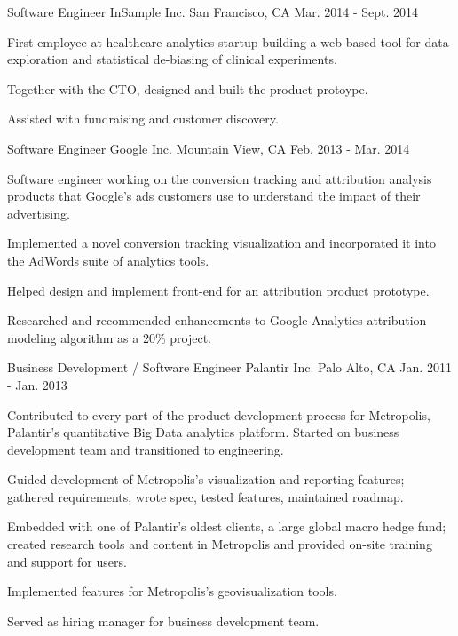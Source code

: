 \begin{cventries}
  \cventry
    {Software Engineer} %
    {InSample Inc.} %
    {San Francisco, CA} %
    {Mar. 2014 - Sept. 2014} %
    {
      \begin{cvitems} %
        \item {First employee at healthcare analytics startup building a web-based tool for data exploration and statistical de-biasing of clinical experiments.}
        \item {Together with the CTO, designed and built the product protoype.}
        \item {Assisted with fundraising and customer discovery.}
      \end{cvitems}
    }

  \cventry
    {Software Engineer} %
    {Google Inc.} %
    {Mountain View, CA} %
    {Feb. 2013 - Mar. 2014} %
    {
      \begin{cvitems} %
        \item {Software engineer working on the conversion tracking and attribution analysis products that Google’s ads customers use to understand the impact of their advertising.}
        \item {Implemented a novel conversion tracking visualization and incorporated it into the AdWords suite of analytics tools.}
        \item {Helped design and implement front-end for an attribution product prototype.}
        \item {Researched and recommended enhancements to Google Analytics attribution modeling algorithm as a 20\% project.}
      \end{cvitems}
    }

  \cventry
    {Business Development / Software Engineer} %
    {Palantir Inc.} %
    {Palo Alto, CA} %
    {Jan. 2011 - Jan. 2013} %
    {
      \begin{cvitems} %
        \item {Contributed to every part of the product development process for Metropolis, Palantir’s quantitative Big Data analytics platform. Started on business development team and transitioned to engineering.}
        \item {Guided development of Metropolis’s visualization and reporting features; gathered requirements, wrote spec, tested features, maintained roadmap.}
        \item {Embedded with one of Palantir's oldest clients, a large global macro hedge fund; created research tools and content in Metropolis and provided on-site training and support for users.}
        \item {Implemented features for Metropolis's geovisualization tools.}
        \item {Served as hiring manager for business development team.}
      \end{cvitems}
    }

\end{cventries}
